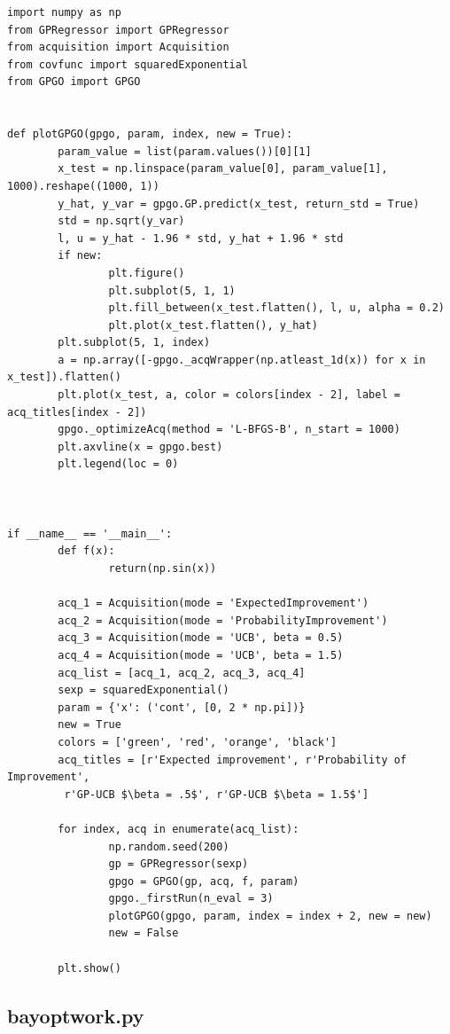 \documentclass[10pt,a4paper,twoside]{book}
\begin{document}
\begin{verbatim}
import numpy as np
from GPRegressor import GPRegressor
from acquisition import Acquisition
from covfunc import squaredExponential
from GPGO import GPGO


def plotGPGO(gpgo, param, index, new = True):
        param_value = list(param.values())[0][1]
        x_test = np.linspace(param_value[0], param_value[1], 1000).reshape((1000, 1))
        y_hat, y_var = gpgo.GP.predict(x_test, return_std = True)
        std = np.sqrt(y_var)
        l, u = y_hat - 1.96 * std, y_hat + 1.96 * std
        if new:
                plt.figure()
                plt.subplot(5, 1, 1)
                plt.fill_between(x_test.flatten(), l, u, alpha = 0.2)
                plt.plot(x_test.flatten(), y_hat)
        plt.subplot(5, 1, index)
        a = np.array([-gpgo._acqWrapper(np.atleast_1d(x)) for x in x_test]).flatten()
        plt.plot(x_test, a, color = colors[index - 2], label = acq_titles[index - 2])
        gpgo._optimizeAcq(method = 'L-BFGS-B', n_start = 1000)
        plt.axvline(x = gpgo.best)
        plt.legend(loc = 0)
        


if __name__ == '__main__':
        def f(x):
                return(np.sin(x))

        acq_1 = Acquisition(mode = 'ExpectedImprovement')
        acq_2 = Acquisition(mode = 'ProbabilityImprovement')
        acq_3 = Acquisition(mode = 'UCB', beta = 0.5)
        acq_4 = Acquisition(mode = 'UCB', beta = 1.5)
        acq_list = [acq_1, acq_2, acq_3, acq_4]
        sexp = squaredExponential()
        param = {'x': ('cont', [0, 2 * np.pi])}
        new = True
        colors = ['green', 'red', 'orange', 'black']
        acq_titles = [r'Expected improvement', r'Probability of Improvement',
         r'GP-UCB $\beta = .5$', r'GP-UCB $\beta = 1.5$']

        for index, acq in enumerate(acq_list):
                np.random.seed(200)
                gp = GPRegressor(sexp)
                gpgo = GPGO(gp, acq, f, param)
                gpgo._firstRun(n_eval = 3)
                plotGPGO(gpgo, param, index = index + 2, new = new)
                new = False

        plt.show()                  
\end{verbatim}

\subsection*{bayoptwork.py}
\label{bayoptwork}
\end{document}
